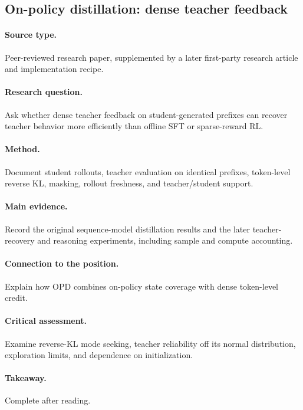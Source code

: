 \subsection{On-policy distillation: dense teacher feedback
\citep{agarwal2024onpolicy,lu2025onpolicydistillation}}
\paragraph{Source type.} Peer-reviewed research paper, supplemented by a later first-party research article and implementation recipe.
\paragraph{Research question.} Ask whether dense teacher feedback on student-generated prefixes can recover teacher behavior more efficiently than offline SFT or sparse-reward RL.
\paragraph{Method.} Document student rollouts, teacher evaluation on identical prefixes, token-level reverse KL, masking, rollout freshness, and teacher/student support.
\paragraph{Main evidence.} Record the original sequence-model distillation results and the later teacher-recovery and reasoning experiments, including sample and compute accounting.
\paragraph{Connection to the position.} Explain how OPD combines on-policy state coverage with dense token-level credit.
\paragraph{Critical assessment.} Examine reverse-KL mode seeking, teacher reliability off its normal distribution, exploration limits, and dependence on initialization.
\paragraph{Takeaway.} Complete after reading.
